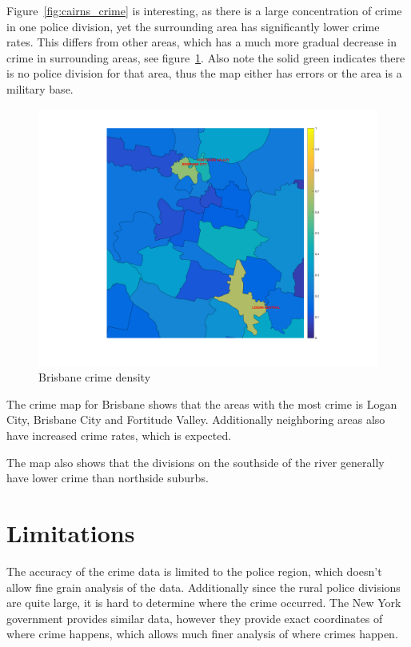 \documentclass[]{article}
\begin{document}
Figure~\ref{fig:cairns_crime} is interesting, as there is a large concentration of crime in one police division,
yet the surrounding area has significantly lower crime rates.
This differs from other areas, which has a much more gradual decrease in crime in surrounding areas, see figure~\ref{fig:brisbane_crime}.
Also note the solid green indicates there is no police division for that area, thus the map either has errors
or the area is a military base.

\begin{figure}[H]
    \caption{Brisbane crime density}
    \centering
    \label{fig:brisbane_crime}
    \includegraphics[width=\linewidth]{../images/brisbane_crime}
\end{figure}

The crime map for Brisbane shows that the areas with the most crime is Logan City, Brisbane City and Fortitude Valley.
Additionally neighboring areas also have increased crime rates, which is expected.

The map also shows that the divisions on the southside of the river generally have lower crime than northside suburbs.

\section{Limitations}

The accuracy of the crime data is limited to the police region, which doesn't allow fine grain analysis of the data.
Additionally since the rural police divisions are quite large, it is hard to determine where the crime occurred.
The New York government provides similar data, however they provide exact coordinates
of where crime happens, which allows much finer analysis of where crimes happen.
\end{document}
